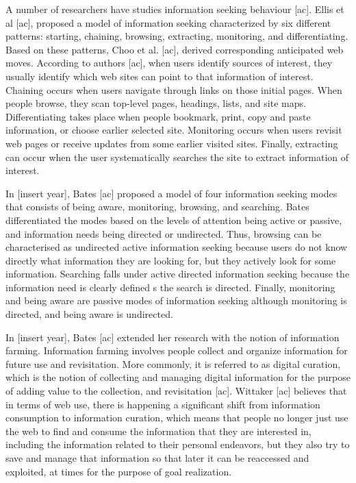 \documentclass{casconpaper}
\begin{document}
{A number of researchers have studies information seeking behaviour [ac]. Ellis et al [ac], proposed a model of information seeking characterized by six different patterns: starting, chaining, browsing, extracting, monitoring, and differentiating. Based on these patterns, Choo et al. [ac], derived corresponding anticipated web moves. According to authors [ac], when users identify sources of interest, they usually identify which web sites can point to that information of interest.  Chaining occurs when users navigate through links on those initial pages. When people browse, they scan top-level pages, headings, lists, and site maps. Differentiating takes place when people bookmark, print, copy and paste information, or choose earlier selected site. Monitoring occurs when users revisit web pages or receive updates from some earlier visited sites. Finally, extracting can occur when the user systematically searches the site to extract information of interest. 

In [insert year], Bates [ac] proposed a model of four information seeking modes that consists of being aware, monitoring, browsing, and searching. Bates differentiated the modes based on the levels of attention being active or passive, and information needs being directed or undirected. Thus, browsing can be characterised as undirected active information seeking because users do not know directly what information they are looking for, but they actively look for some information. Searching falls under active directed information seeking because the information need is clearly defined s the search is directed. Finally, monitoring and being aware are passive modes of information seeking although monitoring is directed, and being aware is undirected.   

In [insert year], Bates [ac] extended her research with the notion of information farming. Information farming involves people collect and organize information for future use and revisitation. More commonly, it is referred to as digital curation, which is the notion of collecting and managing digital information for the purpose of adding value to the collection, and revisitation [ac]. Wittaker [ac] believes that in terms of web use, there is happening a significant shift from information consumption to information curation, which means that people no longer just use the web to find and consume the information that they are interested in, including the information related to their personal endeavors, but they also try to save and manage that information so that later it can be reaccessed and exploited, at times for the purpose of goal realization. 

}
\end{document}
